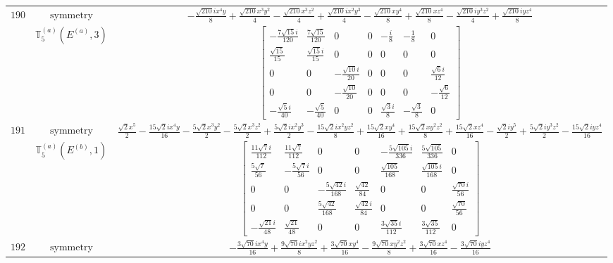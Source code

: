 \documentclass[fleqn,8pt,landscape]{jsarticle}
\begin{document}
\begin{longtable}{ccc}
$ 190 $ & $ \text{symmetry} $ & $ - \frac{\sqrt{210} i x^{4} y}{8} + \frac{\sqrt{210} x^{3} y^{2}}{4} - \frac{\sqrt{210} x^{3} z^{2}}{4} + \frac{\sqrt{210} i x^{2} y^{3}}{4} - \frac{\sqrt{210} x y^{4}}{8} + \frac{\sqrt{210} x z^{4}}{8} - \frac{\sqrt{210} i y^{3} z^{2}}{4} + \frac{\sqrt{210} i y z^{4}}{8} $ \\
$  $ & $ \mathbb{T}_{5}^{(a)}(E^{(a)},3) $ & $ \begin{bmatrix} - \frac{7 \sqrt{15} i}{120} & \frac{7 \sqrt{15}}{120} & 0 & 0 & - \frac{i}{8} & - \frac{1}{8} & 0 \\ \frac{\sqrt{15}}{15} & \frac{\sqrt{15} i}{15} & 0 & 0 & 0 & 0 & 0 \\ 0 & 0 & - \frac{\sqrt{10} i}{20} & 0 & 0 & 0 & \frac{\sqrt{6} i}{12} \\ 0 & 0 & - \frac{\sqrt{10}}{20} & 0 & 0 & 0 & - \frac{\sqrt{6}}{12} \\ - \frac{\sqrt{5} i}{40} & - \frac{\sqrt{5}}{40} & 0 & 0 & \frac{\sqrt{3} i}{8} & - \frac{\sqrt{3}}{8} & 0 \end{bmatrix} $ \\ \hline
$ 191 $ & $ \text{symmetry} $ & $ \frac{\sqrt{2} x^{5}}{2} - \frac{15 \sqrt{2} i x^{4} y}{16} - \frac{5 \sqrt{2} x^{3} y^{2}}{2} - \frac{5 \sqrt{2} x^{3} z^{2}}{2} + \frac{5 \sqrt{2} i x^{2} y^{3}}{2} - \frac{15 \sqrt{2} i x^{2} y z^{2}}{8} + \frac{15 \sqrt{2} x y^{4}}{16} + \frac{15 \sqrt{2} x y^{2} z^{2}}{8} + \frac{15 \sqrt{2} x z^{4}}{16} - \frac{\sqrt{2} i y^{5}}{2} + \frac{5 \sqrt{2} i y^{3} z^{2}}{2} - \frac{15 \sqrt{2} i y z^{4}}{16} $ \\
$  $ & $ \mathbb{T}_{5}^{(a)}(E^{(b)},1) $ & $ \begin{bmatrix} \frac{11 \sqrt{7} i}{112} & \frac{11 \sqrt{7}}{112} & 0 & 0 & - \frac{5 \sqrt{105} i}{336} & \frac{5 \sqrt{105}}{336} & 0 \\ \frac{5 \sqrt{7}}{56} & - \frac{5 \sqrt{7} i}{56} & 0 & 0 & \frac{\sqrt{105}}{168} & \frac{\sqrt{105} i}{168} & 0 \\ 0 & 0 & - \frac{5 \sqrt{42} i}{168} & \frac{\sqrt{42}}{84} & 0 & 0 & \frac{\sqrt{70} i}{56} \\ 0 & 0 & \frac{5 \sqrt{42}}{168} & \frac{\sqrt{42} i}{84} & 0 & 0 & \frac{\sqrt{70}}{56} \\ - \frac{\sqrt{21} i}{48} & \frac{\sqrt{21}}{48} & 0 & 0 & \frac{3 \sqrt{35} i}{112} & \frac{3 \sqrt{35}}{112} & 0 \end{bmatrix} $ \\ \hline
$ 192 $ & $ \text{symmetry} $ & $ - \frac{3 \sqrt{70} i x^{4} y}{16} + \frac{9 \sqrt{70} i x^{2} y z^{2}}{8} + \frac{3 \sqrt{70} x y^{4}}{16} - \frac{9 \sqrt{70} x y^{2} z^{2}}{8} + \frac{3 \sqrt{70} x z^{4}}{16} - \frac{3 \sqrt{70} i y z^{4}}{16} $ \\

\end{longtable}
\end{document}
